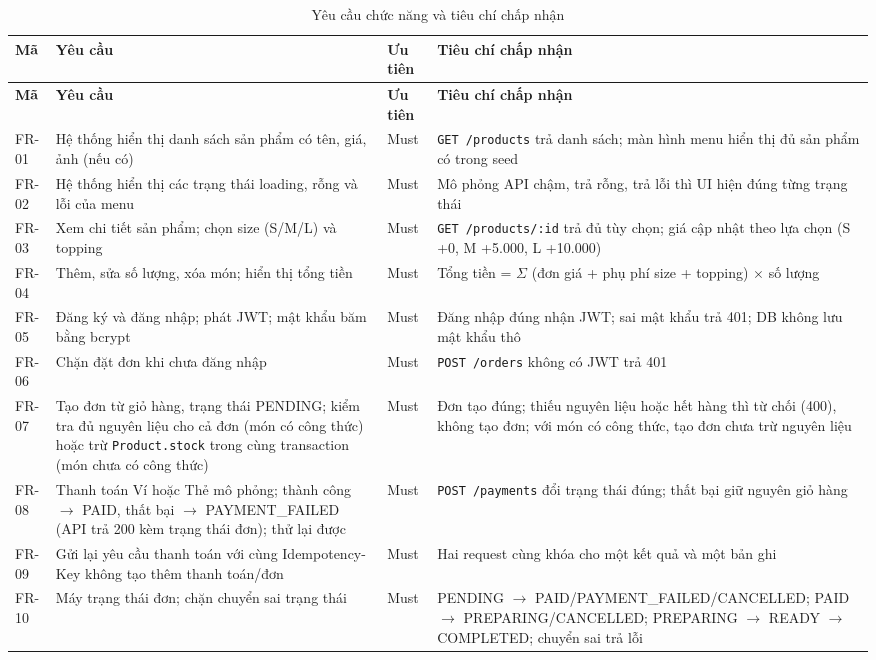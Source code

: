 \documentclass[a4paper]{article}
\begin{document}
{\small
\begin{longtable}{@{}p{1.09cm}p{4.89cm}p{1.09cm}p{5.98cm}@{}}
\caption{Yêu cầu chức năng và tiêu chí chấp nhận}\label{tab:fr}\\
\toprule \textbf{Mã} & \textbf{Yêu cầu} & \textbf{Ưu tiên} & \textbf{Tiêu chí chấp nhận} \\ \midrule \endfirsthead
\toprule \textbf{Mã} & \textbf{Yêu cầu} & \textbf{Ưu tiên} & \textbf{Tiêu chí chấp nhận} \\ \midrule \endhead
\bottomrule \endlastfoot
FR-01 & Hệ thống hiển thị danh sách sản phẩm có tên, giá, ảnh (nếu có) & Must & \texttt{GET /\allowbreak{}products} trả danh sách; màn hình menu hiển thị đủ sản phẩm có trong seed \\
FR-02 & Hệ thống hiển thị các trạng thái loading, rỗng và lỗi của menu & Must & Mô phỏng API chậm, trả rỗng, trả lỗi thì UI hiện đúng từng trạng thái \\
FR-03 & Xem chi tiết sản phẩm; chọn size (S/M/L) và topping & Must & \texttt{GET /\allowbreak{}products/\allowbreak{}:id} trả đủ tùy chọn; giá cập nhật theo lựa chọn (S +0, M +5.000, L +10.000) \\
FR-04 & Thêm, sửa số lượng, xóa món; hiển thị tổng tiền & Must & Tổng tiền = $\Sigma$ (đơn giá + phụ phí size + topping) $\times$ số lượng \\
FR-05 & Đăng ký và đăng nhập; phát JWT; mật khẩu băm bằng bcrypt & Must & Đăng nhập đúng nhận JWT; sai mật khẩu trả 401; DB không lưu mật khẩu thô \\
FR-06 & Chặn đặt đơn khi chưa đăng nhập & Must & \texttt{POST /\allowbreak{}orders} không có JWT trả 401 \\
FR-07 & Tạo đơn từ giỏ hàng, trạng thái PENDING; kiểm tra đủ nguyên liệu cho cả đơn (món có công thức) hoặc trừ \texttt{Product.stock} trong cùng transaction (món chưa có công thức) & Must & Đơn tạo đúng; thiếu nguyên liệu hoặc hết hàng thì từ chối (400), không tạo đơn; với món có công thức, tạo đơn chưa trừ nguyên liệu \\
FR-08 & Thanh toán Ví hoặc Thẻ mô phỏng; thành công $\to$ PAID, thất bại $\to$ PAYMENT\_FAILED (API trả 200 kèm trạng thái đơn); thử lại được & Must & \texttt{POST /\allowbreak{}payments} đổi trạng thái đúng; thất bại giữ nguyên giỏ hàng \\
FR-09 & Gửi lại yêu cầu thanh toán với cùng Idempotency-Key không tạo thêm thanh toán/đơn & Must & Hai request cùng khóa cho một kết quả và một bản ghi \\
FR-10 & Máy trạng thái đơn; chặn chuyển sai trạng thái & Must & PENDING $\to$ PAID/PAYMENT\_FAILED/CANCELLED; PAID $\to$ PREPARING/CANCELLED; PREPARING $\to$ READY $\to$ COMPLETED; chuyển sai trả lỗi \\

\end{longtable}}
\end{document}
